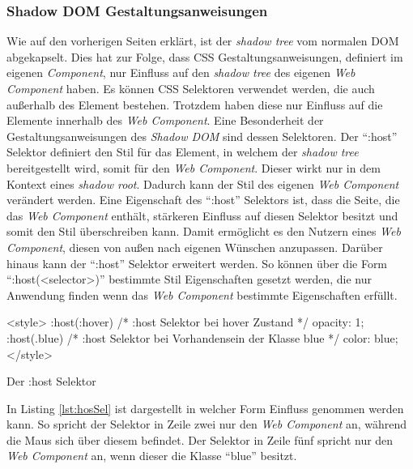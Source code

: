 \documentclass[12pt, paper=a4, bibtotoc, toc=listof, headsepline=true]{scrreprt}
\begin{document}
		\subsubsection{Shadow DOM Gestaltungsanweisungen}
		Wie auf den vorherigen Seiten erklärt, ist der \emph{shadow tree} vom normalen \ac{DOM} abgekapselt. Dies hat zur Folge, dass \ac{CSS} Gestaltungsanweisungen, definiert im eigenen \emph{Component}, nur Einfluss auf den \emph{shadow tree} des eigenen \emph{Web Component} haben. Es können \ac{CSS} Selektoren verwendet werden, die auch außerhalb des Element bestehen. Trotzdem haben diese nur Einfluss auf die Elemente innerhalb des \emph{Web Component}.  
		 \newline
		Eine Besonderheit der Gestaltungsanweisungen des \emph{Shadow DOM} sind dessen Selektoren. Der \enquote{:host} Selektor definiert den Stil für das Element, in welchem der \emph{shadow tree} bereitgestellt wird, somit für den \emph{Web Component}. Dieser wirkt nur in dem Kontext eines \emph{shadow root}. Dadurch kann der Stil des eigenen \emph{Web Component} verändert werden. Eine Eigenschaft des \enquote{:host} Selektors ist, dass die Seite, die das \emph{Web Component} enthält, stärkeren Einfluss auf diesen Selektor besitzt und somit den Stil überschreiben kann. Damit ermöglicht es den Nutzern eines \emph{Web Component}, diesen von außen nach eigenen Wünschen anzupassen. Darüber hinaus kann der \enquote{:host} Selektor erweitert werden. So können über die Form \enquote{:host(<selector>)} bestimmte Stil Eigenschaften gesetzt werden, die nur Anwendung finden wenn das \emph{Web Component} bestimmte Eigenschaften erfüllt. 
		\begin{listing}
		\begin{HTMLcode*}{}
<style>		
:host(:hover) { /* :host Selektor bei hover Zustand */
   opacity: 1;
}
:host(.blue) { /* :host Selektor bei Vorhandensein der Klasse blue */
   color: blue;
}
</style>
		\end{HTMLcode*}
		\caption{Der :host Selektor}
		\label{lst:hosSel}
		\end{listing}
		In Listing \ref{lst:hosSel} ist dargestellt in welcher Form Einfluss genommen werden kann. So spricht der Selektor in Zeile zwei nur den \emph{Web Component} an, während die Maus sich über diesem befindet. Der Selektor in Zeile fünf spricht nur den \emph{Web Component} an, wenn dieser die Klasse \enquote{blue} besitzt.
\end{document}
